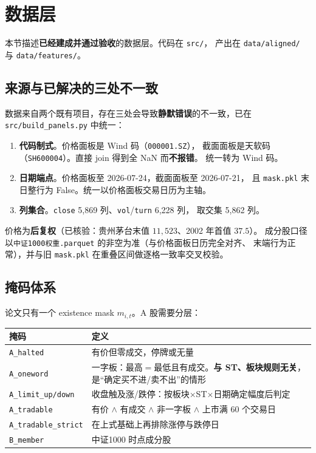 \documentclass[11pt, a4paper]{ctexart}
\newcommand{\file}[1]{\texttt{\small #1}}
\begin{document}
\section{数据层}

本节描述\textbf{已经建成并通过验收}的数据层。代码在 \file{src/}，
产出在 \file{data/aligned/} 与 \file{data/features/}。

\subsection{来源与已解决的三处不一致}

数据来自两个既有项目，存在三处会导致\textbf{静默错误}的不一致，已在
\file{src/build\_panels.py} 中统一：

\begin{enumerate}
  \item \textbf{代码制式}。价格面板是 Wind 码（\file{000001.SZ}），
        截面面板是天软码（\file{SH600004}）。直接 join 得到全 NaN 而\textbf{不报错}。
        统一转为 Wind 码。
  \item \textbf{日期端点}。价格面板至 2026-07-24，截面面板至 2026-07-21，
        且 \file{mask.pkl} 末日整行为 False。统一以价格面板交易日历为主轴。
  \item \textbf{列集合}。\file{close} 5{,}869 列、\file{vol}/\file{turn} 6{,}228 列，
        取交集 5{,}862 列。
\end{enumerate}

价格为\textbf{后复权}（已核验：贵州茅台末值 $11{,}523$、2002 年首值 $37.5$）。
成分股口径以\file{中证1000权重.parquet} 的非空为准（与价格面板日历完全对齐、
末端行为正常），并与旧 \file{mask.pkl} 在重叠区间做逐格一致率交叉校验。

\subsection{掩码体系}

论文只有一个 existence mask $m_{i,t}$。A 股需要分层：

\begin{table}[h]
\centering
\small
\begin{tabular}{lp{10.5cm}}
\toprule
掩码 & 定义 \\
\midrule
\file{A\_halted} & 有价但零成交，停牌或无量 \\
\file{A\_oneword} & 一字板：最高$=$最低且有成交。\textbf{与 ST、板块规则无关}，
                    是“确定买不进/卖不出”的情形 \\
\file{A\_limit\_up/down} & 收盘触及涨/跌停：按板块$\times$ST$\times$日期确定幅度后判定 \\
\file{A\_tradable} & 有价 $\wedge$ 有成交 $\wedge$ 非一字板 $\wedge$ 上市满 60 个交易日 \\
\file{A\_tradable\_strict} & 在上式基础上再排除涨停与跌停日 \\
\file{B\_member} & 中证1000 时点成分股 \\
\bottomrule
\end{tabular}
\end{table}
\end{document}
